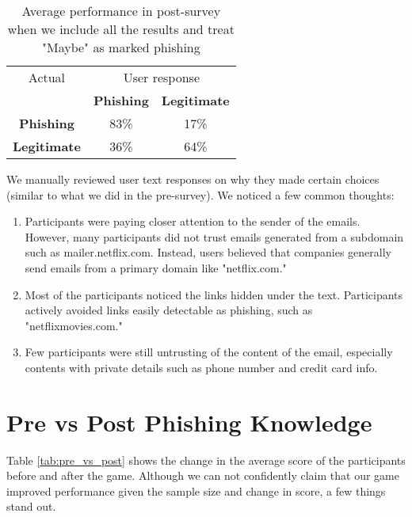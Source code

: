 \begin{table}[!ht]
    \begin{center}

        \begin{tabular}{c | c c}
            Actual              & \multicolumn{2}{c}{User response}                       \\
                                & \textbf{Phishing}                 & \textbf{Legitimate} \\
            \textbf{Phishing}   & 83\%                              & 17\%                \\
            \textbf{Legitimate} & 36\%                              & 64\%                \\
        \end{tabular}
        \caption[Average performance in post-survey (II)]{Average performance in post-survey when we include all the results and treat "Maybe" as marked phishing}
        \label{tab:post_survey_responses_all}
    \end{center}
\end{table}

We manually reviewed user text responses on why they made certain choices (similar to what we did in the pre-survey). We noticed a few common thoughts:

\begin{enumerate}
    \item Participants were paying closer attention to the sender of the emails. However, many participants did not trust emails generated from a subdomain such as mailer.netflix.com. Instead, users believed that companies generally send emails from a primary domain like "netflix.com."
    \item Most of the participants noticed the links hidden under the text. Participants actively avoided links easily detectable as phishing, such as "netflixmovies.com."
    \item Few participants were still untrusting of the content of the email, especially contents with private details such as phone number and credit card info.
\end{enumerate}

\section{Pre vs Post Phishing Knowledge}
Table \ref{tab:pre_vs_post} shows the change in the average score of the participants before and after the game. Although we can not confidently claim that our game improved performance given the sample size and change in score, a few things stand out.

